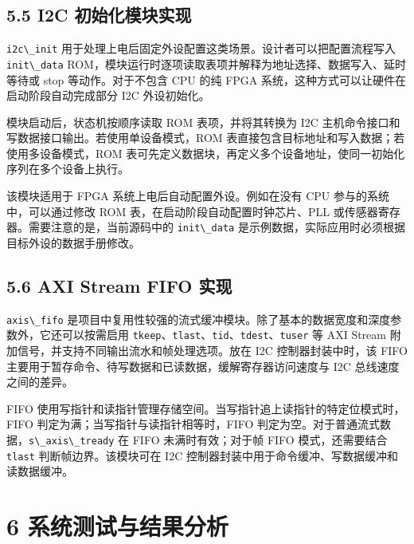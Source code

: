 \subsection{5.5 I2C
初始化模块实现}\label{i2c-ux521dux59cbux5316ux6a21ux5757ux5b9eux73b0}

\passthrough{\lstinline!i2c\_init!}
用于处理上电后固定外设配置这类场景。设计者可以把配置流程写入
\passthrough{\lstinline!init\_data!}
ROM，模块运行时逐项读取表项并解释为地址选择、数据写入、延时等待或 stop
等动作。对于不包含 CPU 的纯 FPGA
系统，这种方式可以让硬件在启动阶段自动完成部分 I2C 外设初始化。

模块启动后，状态机按顺序读取 ROM 表项，并将其转换为 I2C
主机命令接口和写数据接口输出。若使用单设备模式，ROM
表直接包含目标地址和写入数据；若使用多设备模式，ROM
表可先定义数据块，再定义多个设备地址，使同一初始化序列在多个设备上执行。

该模块适用于 FPGA 系统上电后自动配置外设。例如在没有 CPU
参与的系统中，可以通过修改 ROM 表，在启动阶段自动配置时钟芯片、PLL
或传感器寄存器。需要注意的是，当前源码中的
\passthrough{\lstinline!init\_data!}
是示例数据，实际应用时必须根据目标外设的数据手册修改。

\subsection{5.6 AXI Stream FIFO
实现}\label{axi-stream-fifo-ux5b9eux73b0}

\passthrough{\lstinline!axis\_fifo!}
是项目中复用性较强的流式缓冲模块。除了基本的数据宽度和深度参数外，它还可以按需启用
\passthrough{\lstinline!tkeep!}、\passthrough{\lstinline!tlast!}、\passthrough{\lstinline!tid!}、\passthrough{\lstinline!tdest!}、\passthrough{\lstinline!tuser!}
等 AXI Stream 附加信号，并支持不同输出流水和帧处理选项。放在 I2C
控制器封装中时，该 FIFO
主要用于暂存命令、待写数据和已读数据，缓解寄存器访问速度与 I2C
总线速度之间的差异。

FIFO
使用写指针和读指针管理存储空间。当写指针追上读指针的特定位模式时，FIFO
判定为满；当写指针与读指针相等时，FIFO
判定为空。对于普通流式数据，\passthrough{\lstinline!s\_axis\_tready!} 在
FIFO 未满时有效；对于帧 FIFO 模式，还需要结合
\passthrough{\lstinline!tlast!} 判断帧边界。该模块可在 I2C
控制器封装中用于命令缓冲、写数据缓冲和读数据缓冲。

\section{6
系统测试与结果分析}\label{ux7cfbux7edfux6d4bux8bd5ux4e0eux7ed3ux679cux5206ux6790}

